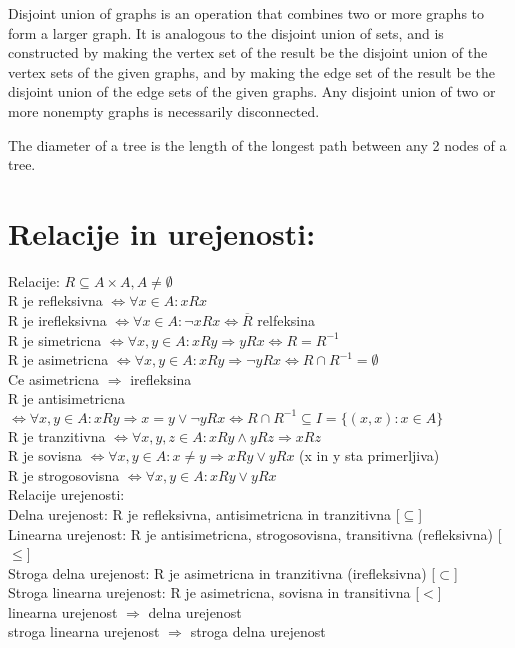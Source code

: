 \documentclass{article}
\begin{document}
Disjoint union of graphs is an operation that combines two or more graphs to form a larger graph. It is analogous to the disjoint union of sets, and is constructed by making the vertex set of the result be the disjoint union of the vertex sets of the given graphs, and by making the edge set of the result be the disjoint union of the edge sets of the given graphs. Any disjoint union of two or more nonempty graphs is necessarily disconnected.

The diameter of a tree is the length of the longest path between any 2 nodes of a tree. 

\section{ Relacije in urejenosti: }
Relacije: $ R\subseteq A\times A, A\neq\emptyset$ \\
R je refleksivna $\Leftrightarrow \forall x\in A: xRx$ \\
R je irefleksivna $\Leftrightarrow \forall x\in A: \neg xRx \Leftrightarrow \overline{R}$ relfeksina \\
R je simetricna $\Leftrightarrow \forall x,y\in A: xRy \Rightarrow yRx \Leftrightarrow R = R^{-1}$ \\
R je asimetricna $\Leftrightarrow \forall x,y\in A: xRy \Rightarrow \neg yRx \Leftrightarrow R \cap R^{-1} = \emptyset$ \\ Ce asimetricna $\Rightarrow$ irefleksina \\
R je antisimetricna $\Leftrightarrow \forall x,y\in A: xRy \Rightarrow x = y \lor \neg yRx \Leftrightarrow R \cap R^{-1} \subseteq I = \{ (x,x): x \in A\} $ \\
R je tranzitivna $\Leftrightarrow \forall x,y,z\in A: xRy \land yRz \Rightarrow xRz$ \\
R je sovisna $\Leftrightarrow \forall x,y\in A: x \neq y \Rightarrow xRy \lor yRx $ (x in y sta primerljiva)\\
R je strogosovisna $\Leftrightarrow \forall x,y\in A: xRy \lor yRx $\\

Relacije urejenosti: \\
Delna urejenost: R je refleksivna, antisimetricna in tranzitivna [$\subseteq$]\\
Linearna urejenost: R je antisimetricna, strogosovisna, transitivna (refleksivna) [$\leq$]\\ 
Stroga delna urejenost: R je asimetricna in tranzitivna (irefleksivna) [$\subset$] \\
Stroga linearna urejenost: R je asimetricna, sovisna in transitivna [$<$] \\
linearna urejenost $\Rightarrow$ delna urejenost \\
stroga linearna urejenost $\Rightarrow$ stroga delna urejenost \\
\end{document}
